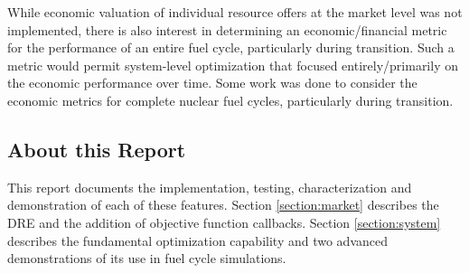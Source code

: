 While economic valuation of individual resource offers at the market level was
not implemented, there is also interest in determining an economic/financial
metric for the performance of an entire fuel cycle, particularly during
transition.  Such a metric would permit system-level optimization that focused
entirely/primarily on the economic performance over time.  Some work was done
to consider the economic metrics for complete nuclear fuel cycles,
particularly during transition.

\subsection{About this Report}

This report documents the implementation, testing, characterization and
demonstration of each of these features.  Section \ref{section:market}
describes the \gls{DRE} and the addition of objective function callbacks.
Section \ref{section:system} describes the fundamental optimization capability
and two advanced demonstrations of its use in fuel cycle simulations.  

